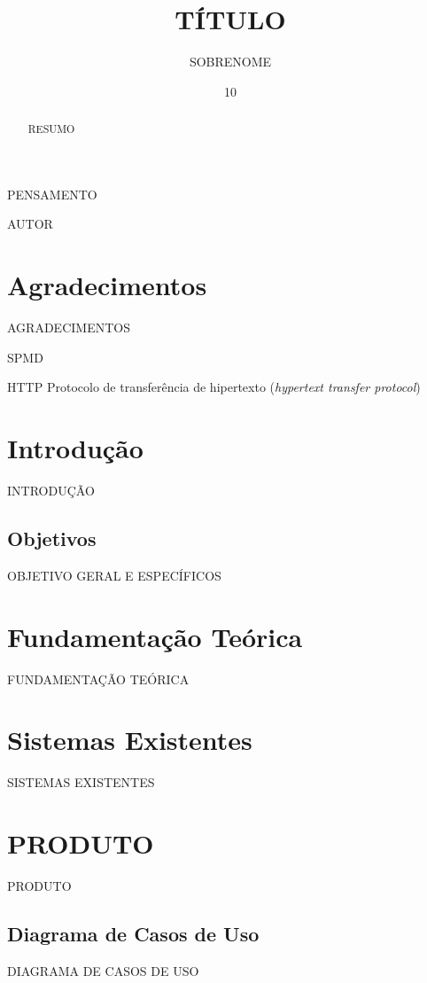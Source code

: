 \documentclass[oneside]{ifrs}
\author{SOBRENOME}{NOME}
\title{TÍTULO}
\date{10}{dezembro}{2015} %
\begin{document}
\maketitle

\epigraph{PENSAMENTO}{AUTOR}

\chapter*{Agradecimentos}
AGRADECIMENTOS

\begin{abstract}
RESUMO
\end{abstract}

\begin{listofabbrv}{SPMD}
	\item[HTTP]Protocolo de transferência de hipertexto (\textit{hypertext transfer protocol})
\end{listofabbrv}

\listoffigures

\listoftables

\tableofcontents

\chapter{Introdução}
INTRODUÇÃO

\section{Objetivos}
OBJETIVO GERAL E ESPECÍFICOS

\chapter{Fundamentação Teórica}
FUNDAMENTAÇÃO TEÓRICA

\chapter{Sistemas Existentes}
SISTEMAS EXISTENTES

\chapter{PRODUTO}
PRODUTO

\section{Diagrama de Casos de Uso}
DIAGRAMA DE CASOS DE USO
\end{document}
